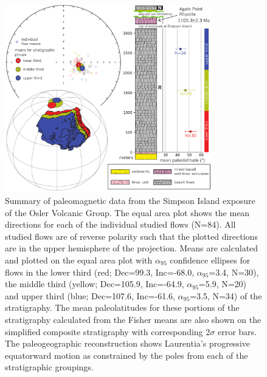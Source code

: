\documentclass[draft,gc]{AGUTeX}
\begin{document}
\begin{figure}
\noindent\includegraphics[width=0.8\textwidth]{2014_Osler_Figures/OslerStrat&EA.pdf}
\caption{Summary of paleomagnetic data from the Simpson Island exposure of the Osler Volcanic Group. The equal area plot shows the mean directions for each of the individual studied flows (N=84). All studied flows are of reverse polarity such that the plotted directions are in the upper hemisphere of the projection. Means are calculated and plotted on the equal area plot with $\alpha_{95}$ confidence ellipses for flows in the lower third (red; Dec=99.3, Inc=-68.0, $\alpha_{95}$=3.4, N=30), the middle third (yellow; Dec=105.9, Inc=-64.9, $\alpha_{95}$=5.9, N=20) and upper third (blue; Dec=107.6, Inc=-61.6, $\alpha_{95}$=3.5, N=34) of the stratigraphy. The mean paleolatitudes for these portions of the stratigraphy calculated from the Fisher means are also shown on the simplified composite stratigraphy with corresponding 2$\sigma$ error bars. The paleogeographic reconstruction shows Laurentia's progressive equatorward motion as constrained by the poles from each of the stratigraphic groupings.}
\label{fig:summary}
\end{figure}
\end{document}
